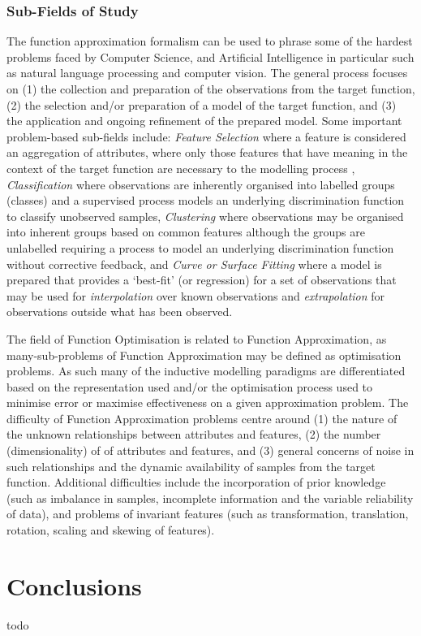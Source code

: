 \documentclass[a4paper, 11pt]{article}
\begin{document}
%
%
\subsubsection{Sub-Fields of Study}
The function approximation formalism can be used to phrase some of the hardest problems faced by Computer Science, and Artificial Intelligence in particular such as natural language processing and computer vision. 
The general process focuses on (1) the collection and preparation of the observations from the target function, (2) the selection and/or preparation of a model of the target function, and (3) the application and ongoing refinement of the prepared model. 
Some important problem-based sub-fields include: \emph{Feature Selection} where a feature is considered an aggregation of attributes, where only those features that have meaning in the context of the target function are necessary to the modelling process \cite{Kudo2000, Guyon2003}, \emph{Classification} where observations are inherently organised into labelled groups (classes) and a supervised process models an underlying discrimination function to classify unobserved samples, \emph{Clustering} where observations may be organised into inherent groups based on common features although the groups are unlabelled requiring a process to model an underlying discrimination function without corrective feedback, and \emph{Curve or Surface Fitting} where a model is prepared that provides a `best-fit' (or regression) for a set of observations that may be used for \emph{interpolation} over known observations and \emph{extrapolation} for observations outside what has been observed.

The field of Function Optimisation is related to Function Approximation, as many-sub-problems of Function Approximation may be defined as optimisation problems. As such many of the inductive modelling paradigms are differentiated based on the representation used and/or the optimisation process used to minimise error or maximise effectiveness on a given approximation problem. 
The difficulty of Function Approximation problems centre around (1) the nature of the unknown relationships between attributes and features, (2) the number (dimensionality) of of attributes and features, and (3) general concerns of noise in such relationships and the dynamic availability of samples from the target function.
Additional difficulties include the incorporation of prior knowledge (such as imbalance in samples, incomplete information and the variable reliability of data), and problems of invariant features (such as transformation, translation, rotation, scaling and skewing of features).



% 
% 
\section{Conclusions}
\label{sec:conclusions}
todo



\end{document}
